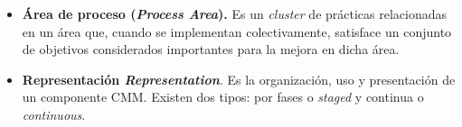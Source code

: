 \begin{itemize}
\item \textbf{\hypertarget{processarea}{Área de proceso} (\textit{Process Area}).} Es un \textit{cluster} de prácticas relacionadas en un área que, cuando se implementan colectivamente, satisface un conjunto de objetivos considerados importantes para la mejora en dicha área. 
\item \textbf{Representación \textit{Representation}}. Es la organización, uso y presentación de un componente CMM. Existen dos tipos: por fases o \textit{staged} y continua o \textit{continuous}.


\end{itemize}
